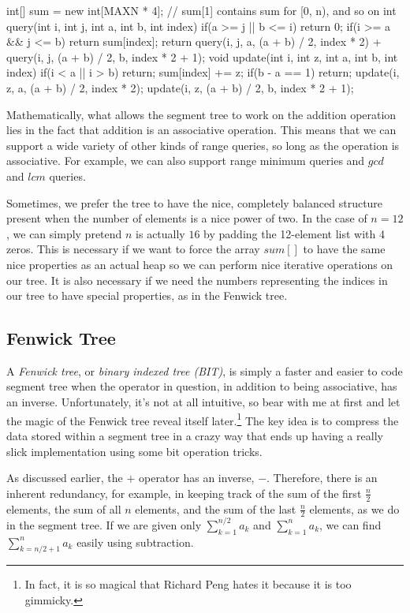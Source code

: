 \begin{mylstlisting}
int[] sum = new int[MAXN * 4]; // sum[1] contains sum for [0, n), and so on
int query(int i, int j, int a, int b, int index) {
	if(a >= j || b <= i)
		return 0;
	if(i >= a && j <= b)
		return sum[index];
	return query(i, j, a, (a + b) / 2, index * 2)
			+ query(i, j, (a + b) / 2, b, index * 2 + 1);
}
void update(int i, int z, int a, int b, int index) {
	if(i < a || i > b)
		return;
	sum[index] += z;
	if(b - a == 1)
		return;
	update(i, z, a, (a + b) / 2, index * 2);
	update(i, z, (a + b) / 2, b, index * 2 + 1);
}
\end{mylstlisting}

Mathematically, what allows the segment tree to work on the addition operation lies in the fact that addition is an associative operation. This means that we can support a wide variety of other kinds of range queries, so long as the operation is associative. For example, we can also support range minimum queries and $gcd$ and $lcm$ queries.

Sometimes, we prefer the tree to have the nice, completely balanced structure present when the number of elements is a nice power of two. In the case of $n=12$, we can simply pretend $n$ is actually $16$ by padding the 12-element list with 4 zeros. This is necessary if we want to force the array $sum[]$ to have the same nice properties as an actual heap so we can perform nice iterative operations on our tree. It is also necessary if we need the numbers representing the indices in our tree to have special properties, as in the Fenwick tree.

\subsection{Fenwick Tree}

A \textit{Fenwick tree}, or \textit{binary indexed tree (BIT)}, is simply a faster and easier to code segment tree when the operator in question, in addition to being associative, has an inverse. Unfortunately, it's not at all intuitive, so bear with me at first and let the magic of the Fenwick tree reveal itself later.\footnote{In fact, it is so magical that Richard Peng hates it because it is too gimmicky.} The key idea is to compress the data stored within a segment tree in a crazy way that ends up having a really slick implementation using some bit operation tricks.

As discussed earlier, the $+$ operator has an inverse, $-$. Therefore, there is an inherent redundancy, for example, in keeping track of the sum of the first $\frac{n}{2}$ elements, the sum of all $n$ elements, and the sum of the last $\frac{n}{2}$ elements, as we do in the segment tree. If we are given only $\sum_{k=1}^{n/2} a_k$ and $\sum_{k=1}^n a_k$, we can find $\sum_{k=n/2+1}^{n} a_k$ easily using subtraction.

